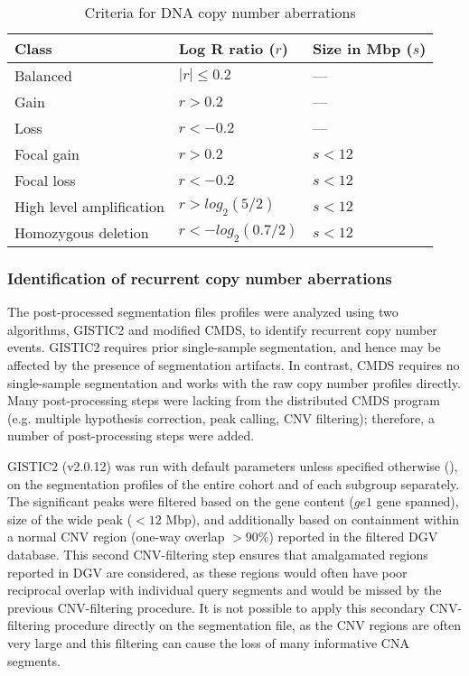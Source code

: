 \begin{table}[H]
	\caption[Criteria for DNA copy number aberrations]
	{
		Criteria for DNA copy number aberrations
	}
	\label{tab:cna-criteria}
	\footnotesize
	\setlength{\extrarowheight}{0.5em}
	\centering
	\begin{tabular}{l | l | l}
		\hline
		\textbf{Class} & \textbf{Log R ratio ($r$)} & \textbf{Size in Mbp ($s$)} \\
		\hline
		Balanced & $| r | \le 0.2$ & --- \\
		Gain & $r > 0.2$ & --- \\
		Loss & $r < -0.2$ & --- \\
		Focal gain & $r > 0.2$ & $s < 12$ \\
		Focal loss & $r < -0.2$ & $s < 12$ \\
		High level amplification & $r > log_2(5/2)$ & $s < 12$ \\
		Homozygous deletion & $r < -log_2(0.7/2)$ & $s < 12$ \\
		\hline
	\end{tabular}
\end{table}

\subsubsection{Identification of recurrent copy number aberrations}

The post-processed segmentation files profiles were analyzed using two algorithms, GISTIC2 and modified CMDS, to identify recurrent copy number events. GISTIC2 requires prior single-sample segmentation, and hence may be affected by the presence of segmentation artifacts. In contrast, CMDS requires no single-sample segmentation and works with the raw copy number profiles directly. Many post-processing steps were lacking from the distributed CMDS program (e.g. multiple hypothesis correction, peak calling, CNV filtering); therefore, a number of post-processing steps were added.

GISTIC2 (v2.0.12)  was run with default parameters unless specified otherwise (), on the segmentation profiles of the entire cohort and of each subgroup separately. The significant peaks were filtered based on the gene content ($ge 1$ gene spanned), size of the wide peak ($< 12$ Mbp), and additionally based on containment within a normal CNV region (one-way overlap $> 90$\%) reported in the filtered DGV database. This second CNV-filtering step ensures that amalgamated regions reported in DGV are considered, as these regions would often have poor reciprocal overlap with individual query segments and would be missed by the previous CNV-filtering procedure. It is not possible to apply this secondary CNV-filtering procedure directly on the segmentation file, as the CNV regions are often very large and this filtering can cause the loss of many informative CNA segments.

